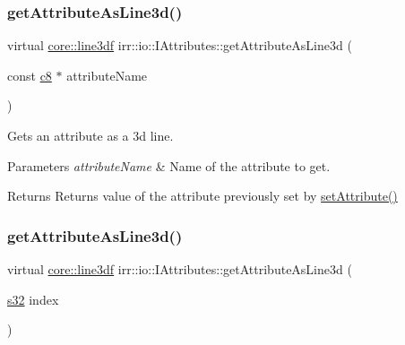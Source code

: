 \subsubsection{\texorpdfstring{get\+Attribute\+As\+Line3d()}{getAttributeAsLine3d()}\hspace{0.1cm}{\footnotesize\ttfamily [1/2]}}
{\footnotesize\ttfamily virtual \hyperlink{namespaceirr_1_1core_a384a3bb17659466af5521c7f74cfcea7}{core\+::line3df} irr\+::io\+::\+I\+Attributes\+::get\+Attribute\+As\+Line3d (\begin{DoxyParamCaption}\item[{const \hyperlink{namespaceirr_a9395eaea339bcb546b319e9c96bf7410}{c8} $\ast$}]{attribute\+Name }\end{DoxyParamCaption})\hspace{0.3cm}{\ttfamily [pure virtual]}}



Gets an attribute as a 3d line. 


\begin{DoxyParams}{Parameters}
{\em attribute\+Name} & Name of the attribute to get. \\
\hline
\end{DoxyParams}
\begin{DoxyReturn}{Returns}
Returns value of the attribute previously set by \hyperlink{classirr_1_1io_1_1IAttributes_a03fa31acb481ae23678676cc183f09a6}{set\+Attribute()} 
\end{DoxyReturn}
\mbox{\label{classirr_1_1io_1_1IAttributes_ab6cc3141c7d5bd82ade97c7da899d025}} 
\subsubsection{\texorpdfstring{get\+Attribute\+As\+Line3d()}{getAttributeAsLine3d()}\hspace{0.1cm}{\footnotesize\ttfamily [2/2]}}
{\footnotesize\ttfamily virtual \hyperlink{namespaceirr_1_1core_a384a3bb17659466af5521c7f74cfcea7}{core\+::line3df} irr\+::io\+::\+I\+Attributes\+::get\+Attribute\+As\+Line3d (\begin{DoxyParamCaption}\item[{\hyperlink{namespaceirr_ac66849b7a6ed16e30ebede579f9b47c6}{s32}}]{index }\end{DoxyParamCaption})\hspace{0.3cm}{\ttfamily [pure virtual]}}



